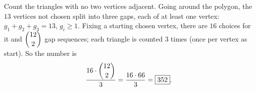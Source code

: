 Count the triangles with no two vertices adjacent. Going around the polygon, the $13$ vertices not chosen split into three gaps, each of at least one vertex: $g_1+g_2+g_3=13$, $g_i\ge1$. Fixing a starting chosen vertex, there are $16$ choices for it and $\dbinom{12}{2}$ gap sequences; each triangle is counted $3$ times (once per vertex as start). So the number is
\[\dfrac{16\cdot\dbinom{12}2}{3}=\dfrac{16\cdot66}{3}=\boxed{352}.\]
